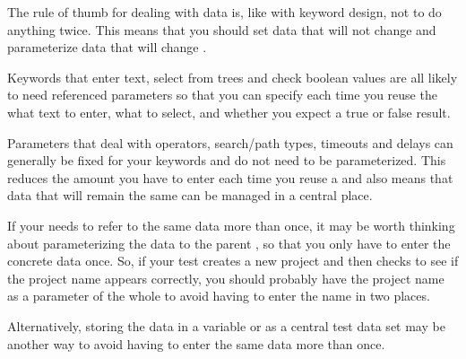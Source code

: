 The rule of thumb for dealing with data is, like with keyword design, not to do anything twice. This means that you should set data that will not change  and parameterize data that will change . 

Keywords that enter text, select from trees and check boolean values are all likely to need referenced parameters so that you can specify each time you reuse the \gdcase{} what text to enter, what to select, and whether you expect a true or false result. 

Parameters that deal with operators, search/path types, timeouts and delays can generally be fixed for your keywords and do not need to be parameterized. This reduces the amount you have to enter each time you reuse a \gdcase{} and also means that data that will remain the same can be managed in a central place. 


If your \gdcase{} needs to refer to the same data more than once, it may be worth thinking about parameterizing the data to the parent \gdcase{}, so that you only have to enter the concrete data once. So, if your test creates a new project and then checks to see if the project name appears correctly, you should probably have the project name as a parameter of the whole \gdcase{} to avoid having to enter the name in two places. 

Alternatively, storing the data in a variable or as a central test data set may be another way to avoid having to enter the same data more than once. 


